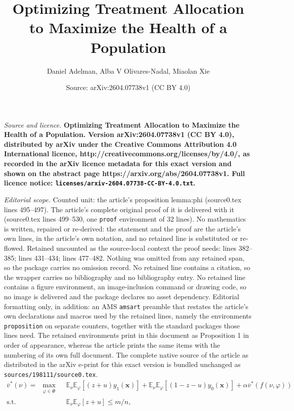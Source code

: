 \documentclass[10pt,a4paper]{amsart}
\title{\bfseries {\Large Optimizing Treatment Allocation to Maximize the Health of a Population}}
\author{Daniel Adelman, Alba V Olivares-Nadal, Miaolan Xie}
\date{Source: arXiv:2604.07738v1 (CC BY 4.0)}
\newcommand{\bx}{\mathbf{x}}
\newcommand{\ov}{\overline{v}}
\begin{document}
\maketitle

\noindent\emph{Source and licence.} \bfseries {\Large Optimizing Treatment Allocation to Maximize the Health of a Population}. Version arXiv:2604.07738v1 (CC BY 4.0), distributed by arXiv under the Creative Commons Attribution 4.0 International licence, http://creativecommons.org/licenses/by/4.0/, as recorded in the arXiv licence metadata for this exact version and shown on the abstract page https://arxiv.org/abs/2604.07738v1. Full licence notice: \texttt{licenses/arxiv-2604.07738-CC-BY-4.0.txt}.\par\smallskip

\noindent\textit{Editorial scope.} Counted unit: the article's proposition lemma:phi (source0.tex lines 495--497). The article's complete original proof of it is delivered with it (source0.tex lines 499--530, one \texttt{proof} environment of 32 lines). No mathematics is written, repaired or re-derived: the statement and the proof are the article's own lines, in the article's own notation, and no retained line is substituted or re-flowed.  Retained uncounted as the source-local context the proof needs: lines 382--385; lines 431--434; lines 477--482.  Nothing was omitted from any retained span, so the package carries no omission record.  No retained line contains a citation, so the wrapper carries no bibliography and no bibliography entry.  No retained line contains a figure environment, an image-inclusion command or drawing code, so no image is delivered and the package declares no asset dependency.  Editorial formatting only, in addition: an AMS \texttt{amsart} preamble that restates the article's own declarations and macros used by the retained lines, namely the environments \texttt{proposition} on separate counters, together with the standard packages those lines need.  The retained environments print in this document as Proposition 1 in order of appearance, whereas the article prints the same items with the numbering of its own full document.  The complete native source of the article as distributed in the arXiv e-print for this exact version is bundled unchanged as \texttt{sources/198111/source0.tex}.
	\begin{align}\label{K*1}\tag{K$^*_1$}
		\ov^*(\nu)= \ \max_{\substack{\varphi \in \Phi}}& \ \mathbb{E}_{\nu}\mathbb{E}_{\varphi} [(z+u) y_1(\bx)]+\mathbb{E}_{\nu}\mathbb{E}_{\varphi} [(1-z-u) y_0(\bx)] + \alpha \ov^{*}(f(\nu,\varphi))\\
		\mbox{s.t.} & \  \mathbb{E}_{\nu}\mathbb{E}_{\varphi} [z+u] \leq m/n, \nonumber
	\end{align}
\end{document}
